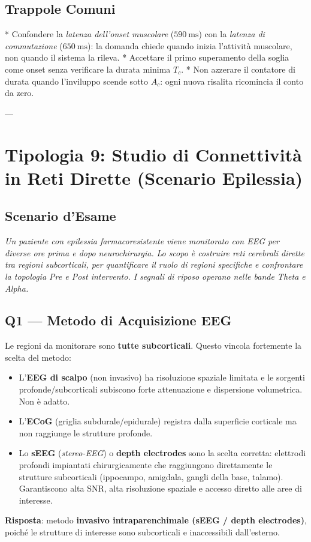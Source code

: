 \documentclass[10pt, letterpaper]{report}
\begin{document}
\subsection*{Trappole Comuni}
* Confondere la \emph{latenza dell'onset muscolare} ($590\ \text{ms}$) con la \emph{latenza di commutazione} ($650\ \text{ms}$): la domanda chiede quando inizia l'attività muscolare, non quando il sistema la rileva.
* Accettare il primo superamento della soglia come onset senza verificare la durata minima $T_c$.
* Non azzerare il contatore di durata quando l'inviluppo scende sotto $A_c$: ogni nuova risalita ricomincia il conto da zero.

---

\section{Tipologia 9: Studio di Connettività in Reti Dirette (Scenario Epilessia)}

\subsection*{Scenario d'Esame}
\emph{Un paziente con epilessia farmacoresistente viene monitorato con EEG per diverse ore prima e dopo neurochirurgia.}
\emph{Lo scopo è costruire reti cerebrali dirette tra regioni subcorticali,
per quantificare il ruolo di regioni specifiche e confrontare la topologia Pre e Post intervento.
I segnali di riposo operano nelle bande Theta e Alpha.}

\subsection*{Q1 — Metodo di Acquisizione EEG}

Le regioni da monitorare sono \textbf{tutte subcorticali}. Questo vincola fortemente la scelta del metodo:
\begin{itemize}
    \item L'\textbf{EEG di scalpo} (non invasivo) ha risoluzione spaziale limitata e le sorgenti profonde/subcorticali subiscono forte attenuazione e dispersione volumetrica. Non è adatto.
    \item L'\textbf{ECoG} (griglia subdurale/epidurale) registra dalla superficie corticale ma non raggiunge le strutture profonde.
    \item Lo \textbf{sEEG} (\emph{stereo-EEG}) o \textbf{depth electrodes} sono la scelta corretta: elettrodi profondi impiantati chirurgicamente che raggiungono direttamente le strutture subcorticali (ippocampo, amigdala, gangli della base, talamo).
    Garantiscono alta SNR, alta risoluzione spaziale e accesso diretto alle aree di interesse.
\end{itemize}
\textbf{Risposta}: metodo \textbf{invasivo intraparenchimale (sEEG / depth electrodes)}, poiché le strutture di interesse sono subcorticali e inaccessibili dall'esterno.
\end{document}
